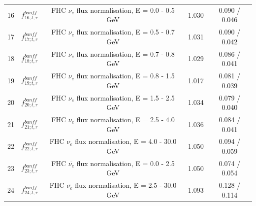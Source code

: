 \begin{tabular} { | c | c | c | c | c |  }
16 & $f_{16; t, r}^{banff}$ & FHC $\nu_e$ flux normalisation, E = 0.0 - 0.5 GeV & 1.030 & 0.090 / 0.046\\ 
17 & $f_{17; t, r}^{banff}$ & FHC $\nu_e$ flux normalisation, E = 0.5 - 0.7 GeV & 1.031 & 0.090 / 0.042\\ 
18 & $f_{18; t, r}^{banff}$ & FHC $\nu_e$ flux normalisation, E = 0.7 - 0.8 GeV & 1.029 & 0.086 / 0.041\\ 
19 & $f_{19; t, r}^{banff}$ & FHC $\nu_e$ flux normalisation, E = 0.8 - 1.5 GeV & 1.017 & 0.081 / 0.039\\ 
20 & $f_{20; t, r}^{banff}$ & FHC $\nu_e$ flux normalisation, E = 1.5 - 2.5 GeV & 1.034 & 0.079 / 0.040\\ 
21 & $f_{21; t, r}^{banff}$ & FHC $\nu_e$ flux normalisation, E = 2.5 - 4.0 GeV & 1.036 & 0.084 / 0.041\\ 
22 & $f_{22; t, r}^{banff}$ & FHC $\nu_e$ flux normalisation, E = 4.0 - 30.0 GeV & 1.050 & 0.094 / 0.059\\ 
23 & $f_{23; t, r}^{banff}$ & FHC $\bar{\nu_e}$ flux normalisation, E = 0.0 - 2.5 GeV & 1.050 & 0.074 / 0.054\\ 
24 & $f_{24; t, r}^{banff}$ & FHC $\bar{\nu_e}$ flux normalisation, E = 2.5 - 30.0 GeV & 1.093 & 0.128 / 0.114\\ 

\hline

\end{tabular}